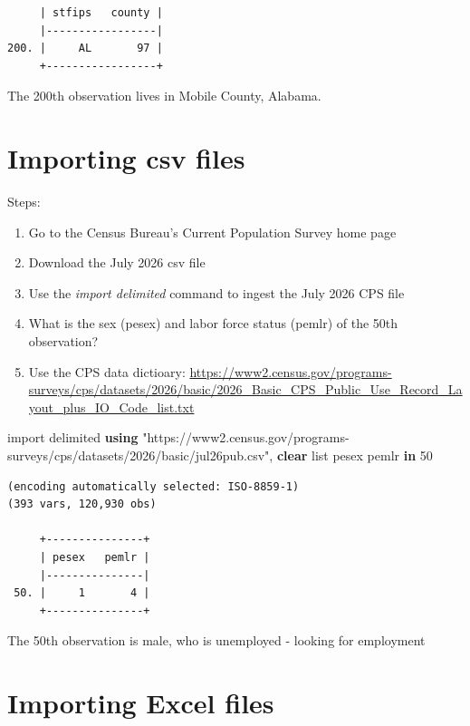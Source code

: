 \documentclass[
]{book}
\newenvironment{Shaded}{\begin{snugshade}}{\end{snugshade}}
\newcommand{\KeywordTok}[1]{\textcolor[rgb]{0.13,0.29,0.53}{\textbf{#1}}}
\newcommand{\NormalTok}[1]{#1}
\newcommand{\OtherTok}[1]{\textcolor[rgb]{0.56,0.35,0.01}{#1}}
\newcommand{\StringTok}[1]{\textcolor[rgb]{0.31,0.60,0.02}{#1}}
\providecommand{\tightlist}{%
  \setlength{\itemsep}{0pt}\setlength{\parskip}{0pt}}
\begin{document}
\begin{verbatim}
     | stfips   county |
     |-----------------|
200. |     AL       97 |
     +-----------------+
\end{verbatim}

The 200th observation lives in Mobile County, Alabama.

\section{Importing csv files}\label{importing-csv-files-1}

Steps:

\begin{enumerate}
\def\labelenumi{\arabic{enumi}.}
\tightlist
\item
  Go to the Census Bureau's Current Population Survey home page
\item
  Download the July 2026 csv file
\item
  Use the \emph{import delimited} command to ingest the July 2026 CPS file
\item
  What is the sex (pesex) and labor force status (pemlr) of the 50th observation?
\item
  Use the CPS data dictioary: \url{https://www2.census.gov/programs-surveys/cps/datasets/2026/basic/2026_Basic_CPS_Public_Use_Record_Layout_plus_IO_Code_list.txt}
\end{enumerate}

\begin{Shaded}
\begin{Highlighting}[]
\NormalTok{import delimited }\KeywordTok{using} \StringTok{"https://www2.census.gov/programs{-}surveys/cps/datasets/2026/basic/jul26pub.csv"}\NormalTok{, }\KeywordTok{clear}
\OtherTok{list}\NormalTok{ pesex pemlr }\KeywordTok{in}\NormalTok{ 50}
\end{Highlighting}
\end{Shaded}

\begin{verbatim}
(encoding automatically selected: ISO-8859-1)
(393 vars, 120,930 obs)

     +---------------+
     | pesex   pemlr |
     |---------------|
 50. |     1       4 |
     +---------------+
\end{verbatim}

The 50th observation is male, who is unemployed - looking for employment

\section{Importing Excel files}\label{importing-excel-files-2}
\end{document}

